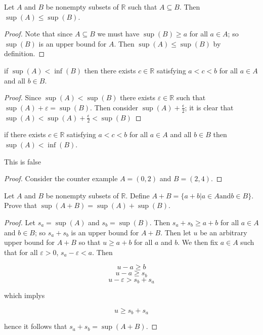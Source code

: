 \documentclass[11pt,largemargins]{homework}
\newcommand{\R}{\mathbb{R}}
\newcommand{\eps}{\varepsilon}
\begin{document}
\begin{alphaparts}
    \questionpart
    Let $A$ and $B$ be nonempty subsets of $\R$ such that $A \subseteq B$. Then $\sup(A) \leq \sup(B)$. 

    \begin{proof}
        Note that since $A \subseteq B$ we must have $\sup(B) \geq a$ for all $a \in A$; so $\sup(B)$ is an upper bound for $A$. Then $\sup(A) \leq \sup(B)$ by definition. 
    \end{proof}

    \questionpart
    if $\sup(A) < \inf(B)$ then there exists $c \in \R$ satisfying $a < c < b$ for all $a \in A$ and all $b \in B$. 

    \begin{proof}
        Since $\sup(A) < \sup(B)$ there exists $\eps \in \R$ such that $\sup(A) +  \eps = \sup(B)$. Then consider $\sup(A) + \frac{\epsilon}{2}$; it is clear that $\sup(A) < \sup(A) + \frac{\epsilon}{2} < \sup(B)$
    \end{proof}

    \questionpart
    if there exists $c \in \R$ satisfying $a < c < b$ for all $a \in A$ and all $b \in B$ then  $\sup(A) < \inf(B)$. 

    This is false
    \begin{proof}
        Consider the counter example $A = (0, 2)$ and $B = (2, 4)$. 
    \end{proof}
\end{alphaparts}

\question
Let $A$ and $B$ be nonempty subsets of $\R$. Define $A + B = \{a + b| a \in A \text{and} b \in B \}$. Prove that 
$\sup(A  + B) = \sup(A) + \sup(B)$. 

\begin{proof}
    Let $s_a = \sup(A)$ and $s_b = \sup(B)$. Then $s_a + s_b \geq a + b$ for all $a \in A $ and $b \in B$; so $s_a + s_b$ is an upper bound for $A + B$. 
    Then let $u$ be an arbitrary upper bound for $A + B$ so that $u \geq a + b$ for all $a$ and $b$. We then fix $a \in A$ 
    such that for all $\eps > 0$, $s_a - \eps < a$. Then 

    \[u - a \geq b\] 
    \[u - a \geq s_b\] 
    \[u - \eps > s_b + s_a\] 

    which implys

    \[u \geq s_b + s_a \] 

    hence it follows that $s_a + s_b = \sup(A + B)$. 
\end{proof}
\end{document}
